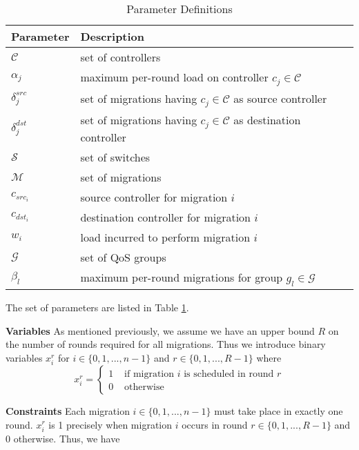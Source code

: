 \documentclass[conference]{IEEEtran}
\begin{document}
\begin{table}[]
    \centering
    \begin{tabular}{||p{1.3cm}|p{6cm}||}
        \hline
        Parameter & Description \\
        \hline\hline
        $\mathcal{C}$ & set of controllers \\
        \hline
        $\alpha_{j}$ & maximum per-round load on controller $c_{j} \in \mathcal{C}$ \\
        \hline
        $\delta^{src}_{j}$ & set of migrations having $c_{j} \in \mathcal{C}$ as source controller \\
        \hline
        $\delta^{dst}_{j}$ & set of migrations having $c_{j} \in \mathcal{C}$ as destination controller \\
        \hline
        $\mathcal{S}$ & set of switches \\
        \hline
        $\mathcal{M}$ & set of migrations \\
        \hline
        $c_{src_{i}}$ & source controller for migration $i$ \\
        \hline
        $c_{dst_{i}}$ & destination controller for migration $i$ \\
        \hline
        $w_{i}$ & load incurred to perform migration $i$ \\
        \hline
        $\mathcal{G}$ & set of QoS groups \\
        \hline
        $\beta_{l}$ & maximum per-round migrations for group $g_{l} \in \mathcal{G}$ \\
        \hline
    \end{tabular}
    \caption{Parameter Definitions}
    \label{tbl:defs}
\end{table}

The set of parameters are listed in Table \ref{tbl:defs}.

\noindent\textbf{Variables}
\noindent As mentioned previously, we assume we have an upper bound $R$ on the number of rounds required for all migrations. Thus we introduce binary variables $x^{r}_{i}$ for $i \in \{0, 1, ..., n - 1\}$ and $r \in \{0, 1, ..., R - 1\}$ where
\[
    x^{r}_{i} =
    \begin{cases}
        1 &\text{ if migration } i \text { is scheduled in round } r \\
        0 &\text{ otherwise}
    \end{cases}
\]

\noindent\textbf{Constraints}
\noindent Each migration $i \in \{0, 1, ..., n - 1\}$ must take place in exactly one round. $x^{r}_{i}$ is 1 precisely when migration $i$ occurs in round $r \in \{0, 1, ..., R-1\}$ and 0 otherwise. Thus, we have
\end{document}
